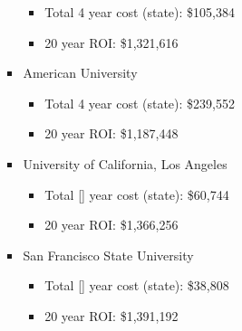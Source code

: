 \begin{itemize}
\begin{itemize}
\begin{itemize}
\begin{itemize}
                        \item{Total 4 year cost (state):} \$105,384 
                        \item{20 year ROI:} \$1,321,616 
                    \end{itemize}
                \item{American University}
                    \begin{itemize}
                        \item{Total 4 year cost (state):} \$239,552 
                        \item{20 year ROI:} \$1,187,448 
                    \end{itemize}
                \item{University of California, Los Angeles}
                    \begin{itemize}
                        \item{Total [] year cost (state):} \$60,744 
                        \item{20 year ROI:} \$1,366,256 
                    \end{itemize}
                \item{San Francisco State University}
                    \begin{itemize}
                        \item{Total [] year cost (state):} \$38,808 
                        \item{20 year ROI:} \$1,391,192 
                    \end{itemize}
            \end{itemize}
    \end{itemize}

\end{itemize}
